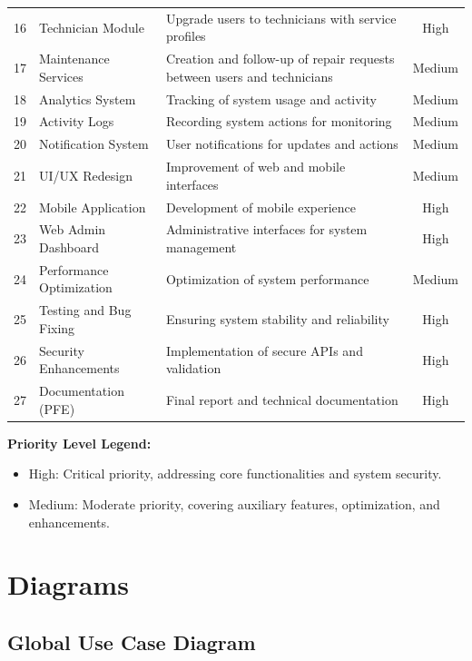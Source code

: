 \documentclass[12pt,a4paper]{report}
\begin{document}
\begin{longtable}{clp{8cm}c}
16 & Technician Module & Upgrade users to technicians with service profiles & High \\
17 & Maintenance Services & Creation and follow-up of repair requests between users and technicians & Medium \\
18 & Analytics System & Tracking of system usage and activity & Medium \\
19 & Activity Logs & Recording system actions for monitoring & Medium \\
20 & Notification System & User notifications for updates and actions & Medium \\
21 & UI/UX Redesign & Improvement of web and mobile interfaces & Medium \\
22 & Mobile Application & Development of mobile experience & High \\
23 & Web Admin Dashboard & Administrative interfaces for system management & High \\
24 & Performance Optimization & Optimization of system performance & Medium \\
25 & Testing and Bug Fixing & Ensuring system stability and reliability & High \\
26 & Security Enhancements & Implementation of secure APIs and validation & High \\
27 & Documentation (PFE) & Final report and technical documentation & High \\
\end{longtable}

\textbf{Priority Level Legend:}
\begin{itemize}
    \item High: Critical priority, addressing core functionalities and system security.
    \item Medium: Moderate priority, covering auxiliary features, optimization, and enhancements.
\end{itemize}

\section{Diagrams}

\subsection{Global Use Case Diagram}
\end{document}

